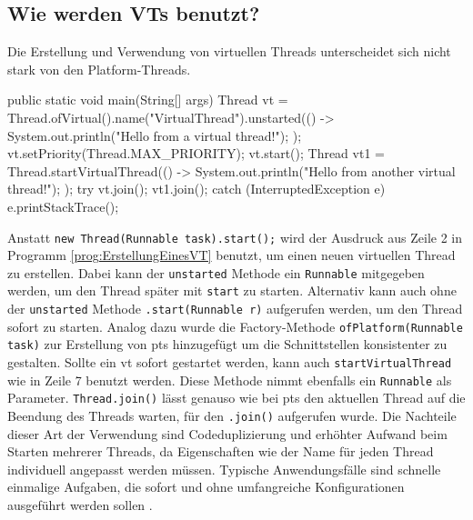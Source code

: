 \subsection{Wie werden VTs benutzt?}
\label{subsec:WieWerdenVTsBenutzt?}

    Die Erstellung und Verwendung von virtuellen Threads unterscheidet sich nicht stark von den Platform-Threads. 
    \begin{program} [H]
        \caption{Erstellung eines \Glspl{vt}}
        \label{prog:ErstellungEinesVT}
    \begin{JavaCode}[language=Java, numbers=left]
public static void main(String[] args) {
    Thread vt = Thread.ofVirtual().name("VirtualThread").unstarted(() -> {
        System.out.println("Hello from a virtual thread!");
    });
    vt.setPriority(Thread.MAX_PRIORITY);
    vt.start();
    Thread vt1 = Thread.startVirtualThread(() -> {
        System.out.println("Hello from another virtual thread!");
    });
    try {
        vt.join(); vt1.join();
    } catch (InterruptedException e) {
        e.printStackTrace();
    }
}\end{JavaCode}
    \end{program}
    Anstatt \texttt{new Thread(Runnable task).start();} wird der Ausdruck aus Zeile 2 in Programm 
    \ref{prog:ErstellungEinesVT} benutzt, um einen neuen virtuellen Thread zu erstellen. Dabei kann der \texttt{unstarted} Methode ein \texttt{Runnable} mitgegeben werden, um den Thread später mit 
    \texttt{start} zu starten. Alternativ kann auch ohne der 
    \texttt{unstarted} Methode \texttt{.start(Runnable r)} aufgerufen werden, um den Thread sofort zu starten. 
    Analog dazu wurde die Factory-Methode \texttt{ofPlatform(Runnable task)} zur Erstellung von \Glspl{pt} hinzugefügt um die Schnittstellen konsistenter zu gestalten.
    Sollte ein \gls{vt} sofort gestartet werden, kann auch \texttt{startVirtualThread} 
    wie in Zeile 7 benutzt werden. Diese Methode nimmt ebenfalls ein
    \texttt{Runnable} als Parameter. \texttt{Thread.join()} lässt genauso wie bei \Glspl{pt} den aktuellen Thread 
    auf die Beendung des Threads warten, für den \texttt{.join()} aufgerufen wurde. Die Nachteile dieser Art der Verwendung sind Codeduplizierung und erhöhter Aufwand
    beim Starten mehrerer Threads, da Eigenschaften wie der Name für jeden Thread individuell angepasst werden müssen. Typische Anwendungsfälle sind schnelle
    einmalige Aufgaben, die sofort und ohne umfangreiche Konfigurationen ausgeführt werden sollen \cite{oracle21Thread}.

